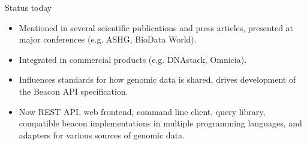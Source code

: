 \documentclass{beamer}
\begin{document}
\begin{frame}[fragile]
\begin{columns}[T]
\begin{column}{.35\textwidth}
\begin{block}{Status today\hfill{}}
\begin{itemize}
\item Mentioned in several scientific publications and press articles, presented at major conferences (e.g. ASHG, BioData World).
\item Integrated in commercial products (e.g. DNAstack, Omnicia).
\item Influences standards for how genomic data is shared, drives development of the Beacon API specification.
\item Now REST API, web frontend, command line client, query library, compatible beacon implementations in multiple programming languages, and adapters for various sources of genomic data.
\end{itemize}
\end{block}
\end{column}

\end{columns}
\end{frame}
\end{document}
